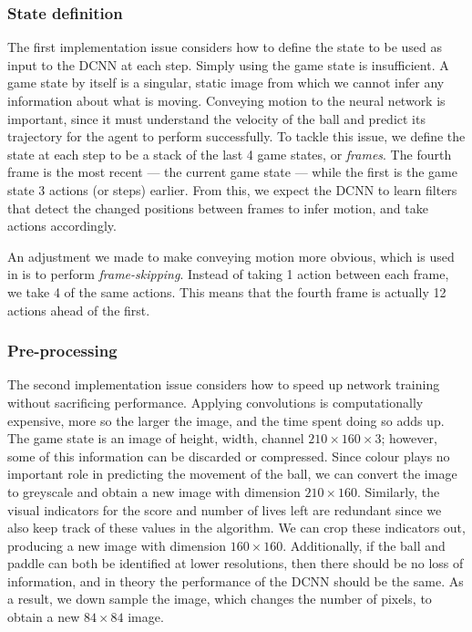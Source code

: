 \documentclass[12pt,a4paper]{article}
\begin{document}
\subsubsection{State definition}
The first implementation issue considers how to define the state to be used as input to the DCNN at each step. Simply using the game state is insufficient. A game state by itself is a singular, static image from which we cannot infer any information about what is moving. Conveying motion to the neural network is important, since it must understand the velocity of the ball and predict its trajectory for the agent to perform successfully. To tackle this issue, we define the state at each step to be a stack of the last 4 game states, or \emph{frames}. The fourth frame is the most recent --- the current game state --- while the first is the game state 3 actions (or steps) earlier. From this, we expect the DCNN to learn filters that detect the changed positions between frames to infer motion, and take actions accordingly.

An adjustment we made to make conveying motion more obvious, which is used in \cite{Mnih2015} is to perform \emph{frame-skipping}. Instead of taking 1 action between each frame, we take 4 of the same actions. This means that the fourth frame is actually 12 actions ahead of the first. 

\subsubsection{Pre-processing}
The second implementation issue considers how to speed up network training without sacrificing performance. Applying convolutions is computationally expensive, more so the larger the image, and the time spent doing so adds up. The game state is an image of height, width, channel $210 \times 160 \times 3$; however, some of this information can be discarded or compressed. Since colour plays no important role in predicting the movement of the ball, we can convert the image to greyscale and obtain a new image with dimension $210 \times 160$. Similarly, the visual indicators for the score and number of lives left are redundant since we also keep track of these values in the algorithm. We can crop these indicators out, producing a new image with dimension $160 \times 160$. Additionally, if the ball and paddle can both be identified at lower resolutions, then there should be no loss of information, and in theory the performance of the DCNN should be the same. As a result, we down sample the image, which changes the number of pixels, to obtain a new $84 \times 84$ image. 
\end{document}
